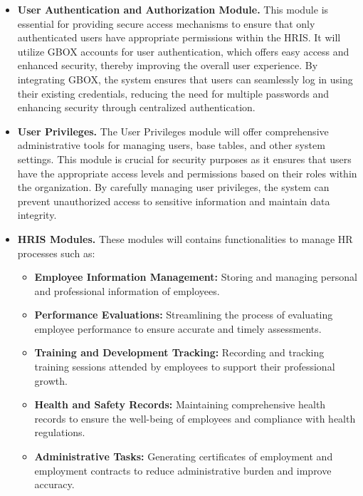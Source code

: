     \begin{itemize}
        \item[] \textbf{User Authentication and Authorization Module.} This module is essential for providing secure access mechanisms to ensure that only authenticated users have appropriate permissions within the HRIS. It will utilize GBOX accounts for user authentication, which offers easy access and enhanced security, thereby improving the overall user experience. By integrating GBOX, the system ensures that users can seamlessly log in using their existing credentials, reducing the need for multiple passwords and enhancing security through centralized authentication.
        \item[] \textbf{User Privileges.} The User Privileges module will offer comprehensive administrative tools for managing users, base tables, and other system settings. This module is crucial for security purposes as it ensures that users have the appropriate access levels and permissions based on their roles within the organization. By carefully managing user privileges, the system can prevent unauthorized access to sensitive information and maintain data integrity.
        \item[] \textbf{HRIS Modules.} These modules will contains functionalities to manage HR processes such as:
        \begin{itemize}
            \item[] \textbf{Employee Information Management:}
            Storing and managing personal and professional information of employees.

            \item[] \textbf{Performance Evaluations: }
            Streamlining the process of evaluating employee performance to ensure accurate and timely assessments.

            \item[] \textbf{Training and Development Tracking: } Recording and tracking training sessions attended by employees to support their professional growth.
            
            \item[] \textbf{Health and Safety Records: } Maintaining comprehensive health records to ensure the well-being of employees and compliance with health regulations.
            
            \item[] \textbf{Administrative Tasks: } Generating certificates of employment and employment contracts to reduce administrative burden and improve accuracy.
            

\end{itemize}
\end{itemize}
